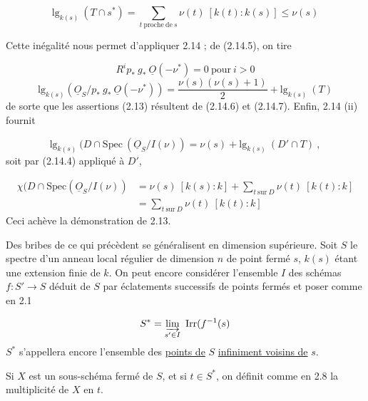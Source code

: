 \begin{equation*}
\mathrm{lg}_{k(s)}\ (T \cap s^*) = \sum_{t\ \mathrm{proche\ de}\ s} \nu(t)\ [k(t) : k(s)] \leq \nu(s)
\end{equation*}


Cette inégalité nous permet d'appliquer 2.14 ; de (2.14.5), on tire

\begin{equation*}
R^i p_* \ g_* \ \underline{O}(-\nu^*) = 0 \ \mathrm{pour}\ i > 0
\end{equation*}
\begin{equation*}
\mathrm{lg}_{k(s)}(\underline{O}_S/p_* \ g_* \ \underline{O}(-\nu^*)) = \frac{\nu(s)(\nu(s)+1)}{2} + \mathrm{lg}_{k(s)}\ (T)
\end{equation*}
de sorte que les assertions (2.13) résultent de (2.14.6) et (2.14.7). Enfin, 2.14 (ii) fournit

\begin{equation*}
\mathrm{lg}_{k(s)}\ (D \cap \mathrm{Spec}\ (\underline{O}_S/I(\nu)) = \nu(s) + \mathrm{lg}_{k(s)}\ (D' \cap T) \ ,
\end{equation*}
soit par (2.14.4) appliqué à $D'$,

\begin{equation*}
\begin{aligned}
\chi(D \cap \mathrm{Spec}(\underline{O}_S/I(\nu)) &= \nu(s)\ [k(s) : k] + \sum_{t\ \mathrm{sur}\ D} \nu(t)\ [k(t) : k] \\
&= \sum_{t\ \mathrm{sur}\ D} \nu(t)\ [k(t) : k]
\end{aligned}
\end{equation*}
Ceci achève la démonstration de 2.13.

Des bribes de ce qui précèdent se généralisent en dimension supérieure. Soit $S$ le spectre d'un anneau local régulier de dimension $n$ de point fermé $s$, $k(s)$ étant une extension finie de $k$. On peut encore considérer l'ensemble $I$ des schémas $f : S' \longrightarrow S$ déduit de $S$ par éclatements successifs de points fermés et poser comme en 2.1

\begin{equation*}
S^* = \varinjlim_{s' \in I} \ \mathrm{Irr}(f^{-1}(s)
\end{equation*}
$S^*$ s'appellera encore l'ensemble des \underline{points de} $S$ \underline{infiniment voisins de} $s$.

Si $X$ est un sous-schéma fermé de $S$, et si $t \in S^*$, on définit comme en 2.8 la multiplicité de $X$ en $t$.

